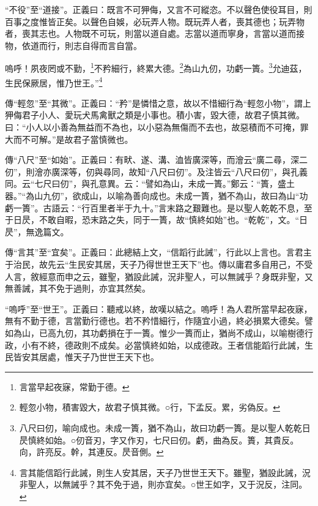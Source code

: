 {\noindent\shu{}\fzkt “不役”至“道接”。正義曰：既言不可狎侮，又言不可縱恣。不以聲色使役耳目，則百事之度惟皆正矣。以聲色自娛，必玩弄人物。既玩弄人者，喪其德也；玩弄物者，喪其志也。人物既不可玩，則當以道自處。志當以道而寧身，言當以道而接物，依道而行，則志自得而言自當。 \par}

嗚呼！夙夜罔或不勤，\footnote{言當早起夜寐，常勤于德。}不矜細行，終累大德。\footnote{輕忽小物，積害毀大，故君子慎其微。○行，下孟反。累，劣偽反。}為山九仞，功虧一簣。\footnote{八尺曰仞，喻向成也。未成一簣，猶不為山，故曰功虧一簣。是以聖人乾乾日昃慎終如始。○仞音刃，字又作刃，七尺曰仞。虧，曲為反。簣，其貴反。向，許亮反。幹，其連反。昃音側。}允迪茲，生民保厥居，惟乃世王。”\footnote{言其能信蹈行此誡，則生人安其居，天子乃世世王天下。雖聖，猶設此誡，況非聖人，以無誡乎？其不免于過，則亦宜矣。○世王如字，又于況反，注同。}


{\noindent\zhuan{}\fzbyks 傳“輕忽”至“其微”。正義曰：“矜”是憐惜之意，故以不惜細行為“輕忽小物”，謂上狎侮君子小人、愛玩犬馬禽獸之類是小事也。積小害，毀大德，故君子慎其微。曰：“小人以小善為無益而不為也，以小惡為無傷而不去也，故惡積而不可掩，罪大而不可解。”是故君子當慎微也。 \par}

{\noindent\zhuan{}\fzbyks 傳“八尺”至“如始”。正義曰：有畎、遂、溝、洫皆廣深等，而澮云“廣二尋，深二仞”，則澮亦廣深等，仞與尋同，故知“八尺曰仞”。及注皆云“八尺曰仞”，與孔義同。云“七尺曰仞”，與孔意異。云：“譬如為山，未成一簣。”鄭云：“簣，盛土器。”“為山九仞”，欲成山，以喻為善向成也。未成一簣，猶不為山，故曰為山“功虧一簣”。古語云：“行百里者半于九十。”言末路之艱難也。是以聖人乾乾不息，至于日昃，不敢自暇，恐末路之失，同于一簣，故“慎終如始”也。“乾乾”，文。“日昃”，無逸篇文。 \par}

{\noindent\zhuan{}\fzbyks 傳“言其”至“宜矣”。正義曰：此總結上文，“信蹈行此誡”，行此以上言也。言君主于治民，故先云“生民安其居，天子乃得世世王天下”也。傳以庸君多自用己，不受人言，敘經意而申之云，雖聖，猶設此誡，況非聖人，可以無誡乎？身既非聖，又無善誡，其不免于過則，亦宜其然矣。 \par}

{\noindent\shu{}\fzkt “嗚呼”至“世王”。正義曰：聽戒以終，故嘆以結之。嗚呼！為人君所當早起夜寐，無有不勤于德，言當勤行德也。若不矜惜細行，作隨宜小過，終必損累大德矣。譬如為山，已高九仞，其功虧損在于一簣。惟少一簣而止，猶尚不成山，以喻樹德行政，小有不終，德政則不成矣。必當慎終如始，以成德政。王者信能蹈行此誡，生民皆安其居處，惟天子乃世世王天下也。 \par}


